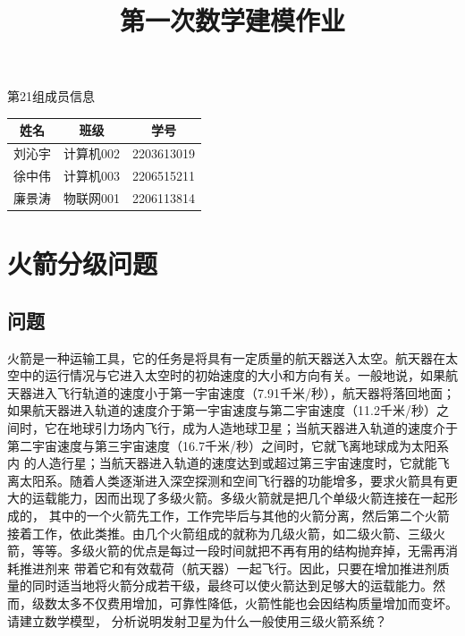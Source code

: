 \documentclass[UTF8]{ctexart}
\title{\textbf{\kaishu\Huge 第一次数学建模作业}}
\begin{document}
	\maketitle
    \centerline{\Large 第21组成员信息}
        \begin{center}
        \begin{tabular}{ccc}
            \toprule
            姓名 & 班级& 学号\\
            \midrule
            刘沁宇 & 计算机002 &2203613019\\
            徐中伟 & 计算机003 &2206515211 \\
            廉景涛 & 物联网001 &2206113814\\
            \bottomrule
        \end{tabular}
        \end{center}
        \newpage 
    

    \section{火箭分级问题}
        \subsection{问题}
        火箭是一种运输工具，它的任务是将具有一定质量的航天器送入太空。航天器在太空中的运行情况与它进入太空时的初始速度的大小和方向有关。一般地说，如果航天器进入飞行轨道的速度小于第一宇宙速度（7.91千米/秒），航天器将落回地面；
        如果航天器进入轨道的速度介于第一宇宙速度与第二宇宙速度（11.2千米/秒）之间时，它在地球引力场内飞行，成为人造地球卫星；当航天器进入轨道的速度介于第二宇宙速度与第三宇宙速度（16.7千米/秒）之间时，它就飞离地球成为太阳系内
        的人造行星；当航天器进入轨道的速度达到或超过第三宇宙速度时，它就能飞离太阳系。随着人类逐渐进入深空探测和空间飞行器的功能增多，要求火箭具有更大的运载能力，因而出现了多级火箭。多级火箭就是把几个单级火箭连接在一起形成的，
        其中的一个火箭先工作，工作完毕后与其他的火箭分离，然后第二个火箭接着工作，依此类推。由几个火箭组成的就称为几级火箭，如二级火箭、三级火箭，等等。多级火箭的优点是每过一段时间就把不再有用的结构抛弃掉，无需再消耗推进剂来
        带着它和有效载荷（航天器）一起飞行。因此，只要在增加推进剂质量的同时适当地将火箭分成若干级，最终可以使火箭达到足够大的运载能力。然而，级数太多不仅费用增加，可靠性降低，火箭性能也会因结构质量增加而变坏。请建立数学模型，
        分析说明发射卫星为什么一般使用三级火箭系统？
        
        
\end{document}
